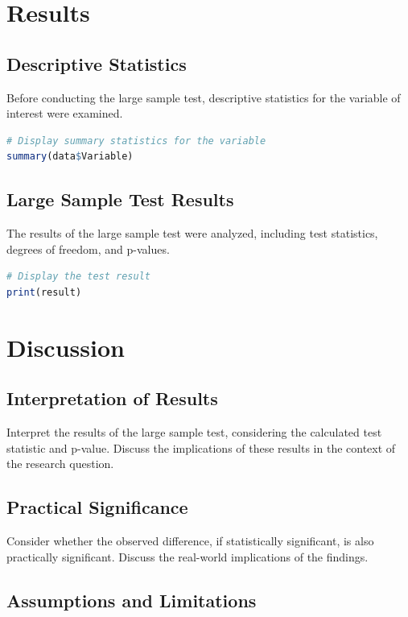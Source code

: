 \documentclass[10pt]{book}
\begin{document}
\section{Results}

\subsection{Descriptive Statistics}

Before conducting the large sample test, descriptive statistics for the variable of interest were examined.

\begin{lstlisting}[language=R]
# Display summary statistics for the variable
summary(data$Variable)
\end{lstlisting}

\subsection{Large Sample Test Results}

The results of the large sample test were analyzed, including test statistics, degrees of freedom, and p-values.

\begin{lstlisting}[language=R]
# Display the test result
print(result)
\end{lstlisting}

\section{Discussion}

\subsection{Interpretation of Results}

Interpret the results of the large sample test, considering the calculated test statistic and p-value. Discuss the implications of these results in the context of the research question.

\subsection{Practical Significance}

Consider whether the observed difference, if statistically significant, is also practically significant. Discuss the real-world implications of the findings.

\subsection{Assumptions and Limitations}
\end{document}
